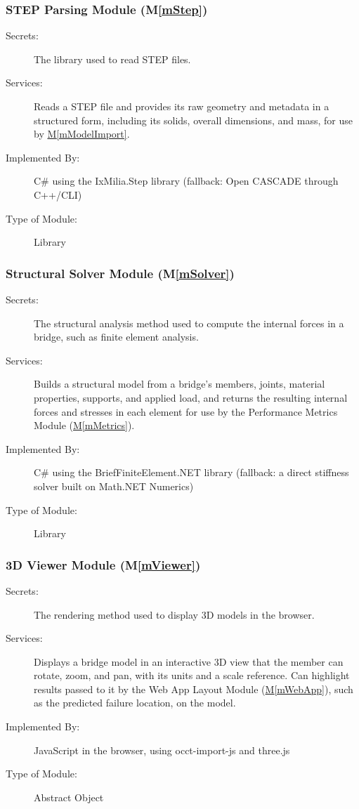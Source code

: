 \documentclass[12pt, titlepage]{article}
\newcommand{\mref}[1]{\hyperref[#1:dec]{M\ref*{#1}}}
\begin{document}
\subsubsection{STEP Parsing Module (M\ref*{mStep})}\label{mStep:dec}

\begin{description}
\item[Secrets:] The library used to read STEP files.
\item[Services:] Reads a STEP file and provides its raw geometry and metadata in
  a structured form, including its solids, overall dimensions, and mass, for use
  by \mref{mModelImport}.
\item[Implemented By:] C\# using the IxMilia.Step library (fallback: Open CASCADE through C++/CLI)
\item[Type of Module:] Library
\end{description}

\subsubsection{Structural Solver Module (M\ref*{mSolver})}\label{mSolver:dec}

\begin{description}
\item[Secrets:] The structural analysis method used to compute the internal forces in a bridge, such as finite element analysis.
\item[Services:] Builds a structural model from a bridge's members, joints,
  material properties, supports, and applied load, and returns the resulting
  internal forces and stresses in each element for use by the Performance
  Metrics Module (\mref{mMetrics}).
\item[Implemented By:] C\# using the BriefFiniteElement.NET library (fallback:
  a direct stiffness solver built on Math.NET Numerics)
\item[Type of Module:] Library
\end{description}

\subsubsection{3D Viewer Module (M\ref*{mViewer})}\label{mViewer:dec}

\begin{description}
\item[Secrets:] The rendering method used to display 3D models in the browser.
\item[Services:] Displays a bridge model in an interactive 3D view that the
  member can rotate, zoom, and pan, with its units and a scale reference. Can
  highlight results passed to it by the Web App Layout Module (\mref{mWebApp}),
  such as the predicted failure location, on the model.
\item[Implemented By:] JavaScript in the browser, using occt-import-js and three.js
\item[Type of Module:] Abstract Object
\end{description}
\end{document}
